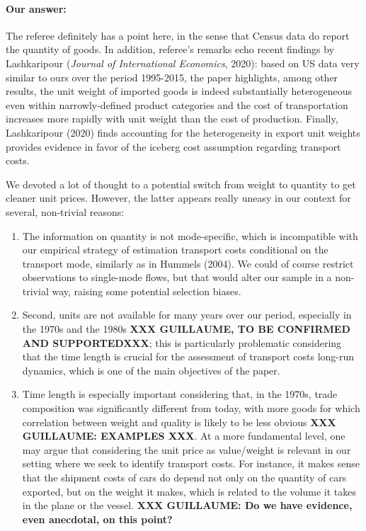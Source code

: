 \documentclass[a4paper,12pt]{article}
\begin{document}
\paragraph{Our answer:}
\noindent The referee definitely has a point here, in the sense that Census data do report the quantity of goods. In addition, referee's remarks echo recent findings by Lashkaripour (\emph{Journal of International Economics}, 2020): based on US data very similar to ours over the period 1995-2015, the paper highlights, among other results, the unit weight of imported goods is indeed substantially heterogeneous even within narrowly-defined product categories and the cost of transportation increases more rapidly with unit weight than the cost of production. Finally, Lashkaripour (2020) finds accounting for the heterogeneity in export unit weights provides evidence in favor of the iceberg cost assumption regarding transport costs.

We devoted a lot of thought to a potential switch from weight to quantity to get cleaner unit prices. However, the latter appears really uneasy in our context for several, non-trivial reasons:

\begin{enumerate}
\item The information on quantity is not mode-specific, which is incompatible with our empirical strategy of estimation transport costs conditional on the transport mode, similarly as in Hummels (2004). We could of course restrict observations to single-mode flows, but that would alter our sample in a non-trivial way, raising some potential selection biases. 
    
\item Second, units are not available for many years over our period, especially in the 1970s and the 1980s \textbf{XXX GUILLAUME, TO BE CONFIRMED AND SUPPORTEDXXX}; this is particularly problematic considering that the time length is crucial for the assessment of transport costs long-run dynamics, which is one of the main objectives of the paper.

\item Time length is especially important considering that, in the 1970s, trade composition was significantly different from today, with more goods for which correlation between weight and quality is likely to be less obvious \textbf{XXX GUILLAUME: EXAMPLES XXX}. At a more fundamental level, one may argue that considering the unit price as value/weight is relevant in our setting where we seek to identify transport costs. For instance, it makes sense that the shipment costs of cars do depend not only on the quantity of cars exported, but on the weight it makes, which is related to the volume it takes in the plane or the vessel. \textbf{XXX GUILLAUME: Do we have evidence, even anecdotal, on this point?}
        
\end{enumerate}
\end{document}

